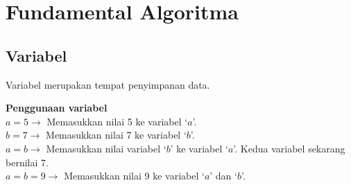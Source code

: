 \chapter{Fundamental Algoritma}\label{ch:app1}




\section{Variabel}
Variabel merupakan tempat penyimpanan data. 
\begin{contoh}
	\textbf{Penggunaan variabel}\\
	$a = 5 \rightarrow$ Memasukkan nilai 5 ke variabel `$a$'.\\
	$b = 7 \rightarrow$ Memasukkan nilai 7 ke variabel `$b$'.\\
	$a = b \rightarrow$ Memasukkan nilai variabel `$b$' ke variabel `$a$'. Kedua variabel sekarang bernilai 7.\\
	$a = b = 9 \rightarrow$ Memasukkan nilai 9 ke variabel `$a$' dan `$b$'.\\
\end{contoh}



\FloatBarrier
